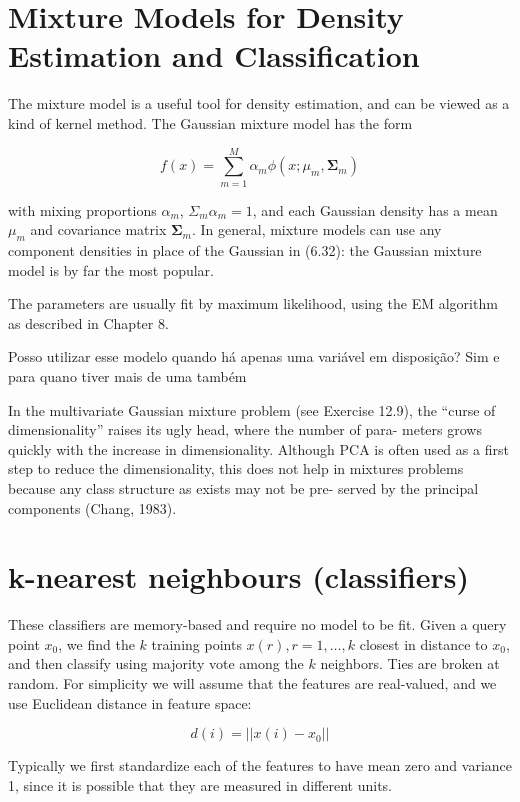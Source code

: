 \section{Mixture Models for Density Estimation and
Classification}

The mixture model is a useful tool for density estimation, and can be viewed
as a kind of kernel method. The Gaussian mixture model has the form

\begin{equation}
    f(x) = \sum^{M}_{m=1} \alpha_m\phi(x; \mu_m, \boldsymbol{\Sigma}_m)
\end{equation}

with mixing proportions $\alpha_m$, $\Sigma_m\alpha_m = 1$, and each Gaussian density has a mean $\mu_m$ and covariance matrix $\boldsymbol{\Sigma}_m$. In general, mixture models can use any component densities in place of the Gaussian in (6.32): the Gaussian mixture model is by far the most popular.

The parameters are usually fit by maximum likelihood, using the EM
algorithm as described in Chapter 8. 

Posso utilizar esse modelo quando há apenas uma variável em disposição? Sim e para quano tiver mais de uma também 

In the multivariate Gaussian mixture problem (see Exercise 12.9), the
“curse of dimensionality” raises its ugly head, where the number of para-
meters grows quickly with the increase in dimensionality. Although PCA
is often used as a first step to reduce the dimensionality, this does not help in mixtures problems because any class structure as exists may not be pre- served by the principal components (Chang, 1983).

\section{k-nearest neighbours (classifiers)}
These classifiers are memory-based and require no model to be fit. Given a query point $x_0$, we find the $k$ training points $x(r), r = 1, \dots,k$ closest in distance to $x_0$, and then classify using majority vote among the $k$ neighbors. Ties are broken at random. For simplicity we will assume that the features are real-valued, and we use Euclidean distance in feature space:

\begin{equation}
    d(i) = ||x(i) - x_0||
\end{equation}

Typically we first standardize each of the features to have mean zero and variance 1, since it is possible that they are measured in different units.

